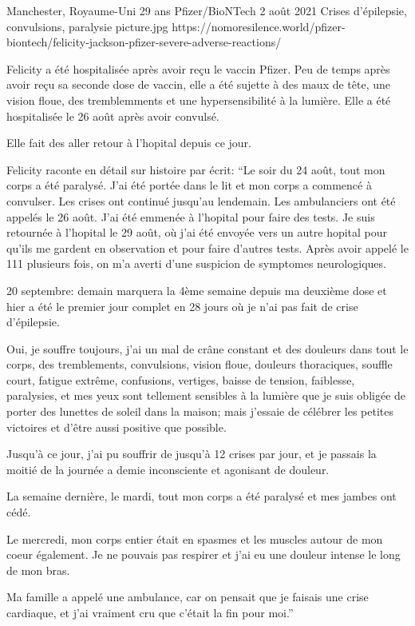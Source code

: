 {Manchester, Royaume-Uni}
{29 ans}
{Pfizer/BioNTech}
{2 août 2021}
{Crises d'épilepsie, convulsions, paralysie}
{picture.jpg}
{https://nomoresilence.world/pfizer-biontech/felicity-jackson-pfizer-severe-adverse-reactions/}
{

Felicity a été hospitalisée après avoir reçu le vaccin Pfizer. Peu de temps après avoir reçu sa seconde dose de vaccin, elle a été sujette à des maux de tête, une vision floue, des tremblemments et une hypersensibilité à la lumière. Elle a été hospitalisée le 26 août après avoir convulsé.

Elle fait des aller retour à l'hopital depuis ce jour.

Felicity raconte en détail sur histoire par écrit: “Le soir du 24 août, tout mon corps a été paralysé. J'ai été portée dans le lit et mon corps a commencé à convulser. Les crises ont continué jusqu'au lendemain. Les ambulanciers ont été appelés le 26 août. J'ai été emmenée à l'hopital pour faire des tests. Je suis retournée à l'hopital le 29 août, où j'ai été envoyée vers un autre hopital pour qu'ils me gardent en observation et pour faire d'autres tests. Après avoir appelé le 111 plusieurs fois, on m'a averti d'une suspicion de symptomes neurologiques.

20 septembre: demain marquera la 4ème semaine depuis ma deuxième dose et hier a été le premier jour complet en 28 jours où je n'ai pas fait de crise d'épilepsie.

Oui, je souffre toujours, j'ai un mal de crâne constant et des douleurs dans tout le corps, des tremblements, convulsions, vision floue, douleurs thoraciques, souffle court, fatigue extrême, confusions, vertiges, baisse de tension, faiblesse, paralysies, et mes yeux sont tellement sensibles à la lumière que je suis obligée de porter des lunettes de soleil dans la maison; mais j'essaie de célébrer les petites victoires et d'être aussi positive que possible.

Jusqu'à ce jour, j'ai pu souffrir de jusqu'à 12 crises par jour, et je passais la moitié de la journée a demie inconsciente et agonisant de douleur.

La semaine dernière, le mardi, tout mon corps a été paralysé et mes jambes ont cédé.

Le mercredi, mon corps entier était en spasmes et les muscles autour de mon coeur également. Je ne pouvais pas respirer et j'ai eu une douleur intense le long de mon bras.

Ma famille a appelé une ambulance, car on pensait que je faisais une crise cardiaque, et j'ai vraiment cru que c'était la fin pour moi.”

}
